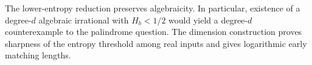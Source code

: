 The lower-entropy reduction preserves algebraicity. In particular, existence of a degree-\(d\) algebraic irrational with \(H_b<1/2\) would yield a degree-\(d\) counterexample to the palindrome question. The dimension construction proves sharpness of the entropy threshold among real inputs and gives logarithmic early matching lengths.

